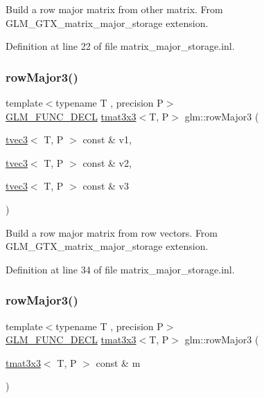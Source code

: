 Build a row major matrix from other matrix. From G\+L\+M\+\_\+\+G\+T\+X\+\_\+matrix\+\_\+major\+\_\+storage extension. 

Definition at line 22 of file matrix\+\_\+major\+\_\+storage.\+inl.

\mbox{\label{group__gtx__matrix__major__storage_gaba4de9afc4e65ec8ea0403e7cba3fb9f}} 
\subsubsection{\texorpdfstring{rowMajor3()}{rowMajor3()}\hspace{0.1cm}{\footnotesize\ttfamily [1/2]}}
{\footnotesize\ttfamily template$<$typename T , precision P$>$ \\
\mbox{\hyperlink{setup_8hpp_ab2d052de21a70539923e9bcbf6e83a51}{G\+L\+M\+\_\+\+F\+U\+N\+C\+\_\+\+D\+E\+CL}} \mbox{\hyperlink{structglm_1_1tmat3x3}{tmat3x3}}$<$T, P$>$ glm\+::row\+Major3 (\begin{DoxyParamCaption}\item[{\mbox{\hyperlink{structglm_1_1tvec3}{tvec3}}$<$ T, P $>$ const \&}]{v1,  }\item[{\mbox{\hyperlink{structglm_1_1tvec3}{tvec3}}$<$ T, P $>$ const \&}]{v2,  }\item[{\mbox{\hyperlink{structglm_1_1tvec3}{tvec3}}$<$ T, P $>$ const \&}]{v3 }\end{DoxyParamCaption})}

Build a row major matrix from row vectors. From G\+L\+M\+\_\+\+G\+T\+X\+\_\+matrix\+\_\+major\+\_\+storage extension. 

Definition at line 34 of file matrix\+\_\+major\+\_\+storage.\+inl.

\mbox{\label{group__gtx__matrix__major__storage_ga38537061135b55e7a053926ca55e6e20}} 
\subsubsection{\texorpdfstring{rowMajor3()}{rowMajor3()}\hspace{0.1cm}{\footnotesize\ttfamily [2/2]}}
{\footnotesize\ttfamily template$<$typename T , precision P$>$ \\
\mbox{\hyperlink{setup_8hpp_ab2d052de21a70539923e9bcbf6e83a51}{G\+L\+M\+\_\+\+F\+U\+N\+C\+\_\+\+D\+E\+CL}} \mbox{\hyperlink{structglm_1_1tmat3x3}{tmat3x3}}$<$T, P$>$ glm\+::row\+Major3 (\begin{DoxyParamCaption}\item[{\mbox{\hyperlink{structglm_1_1tmat3x3}{tmat3x3}}$<$ T, P $>$ const \&}]{m }\end{DoxyParamCaption})}

